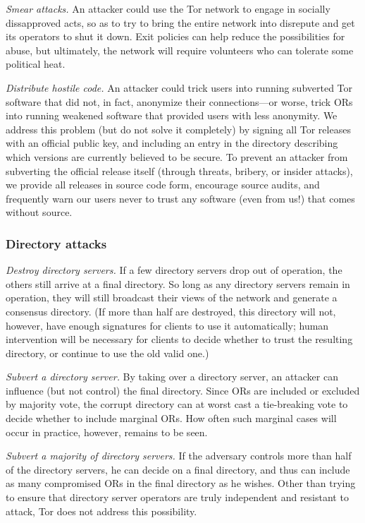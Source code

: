 \documentclass[times,10pt,twocolumn]{article}
\begin{document}
\emph{Smear attacks.} An attacker could use the Tor network to
engage in socially dissapproved acts, so as to try to bring the
entire network into disrepute and get its operators to shut it down.
Exit policies can help reduce the possibilities for abuse, but
ultimately, the network will require volunteers who can tolerate
some political heat.

\emph{Distribute hostile code.} An attacker could trick users
into running subverted Tor software that did not, in fact, anonymize
their connections---or worse, trick ORs into running weakened
software that provided users with less anonymity.  We address this
problem (but do not solve it completely) by signing all Tor releases
with an official public key, and including an entry in the directory
describing which versions are currently believed to be secure.  To
prevent an attacker from subverting the official release itself
(through threats, bribery, or insider attacks), we provide all
releases in source code form, encourage source audits, and
frequently warn our users never to trust any software (even from
us!) that comes without source.

\subsubsection*{Directory attacks}

\emph{Destroy directory servers.}  If a few directory
servers drop out of operation, the others still arrive at a final
directory.  So long as any directory servers remain in operation,
they will still broadcast their views of the network and generate a
consensus directory.  (If more than half are destroyed, this
directory will not, however, have enough signatures for clients to
use it automatically; human intervention will be necessary for
clients to decide whether to trust the resulting directory, or continue
to use the old valid one.)

\emph{Subvert a directory server.}  By taking over a directory
server, an attacker can influence (but not control) the final
directory.  Since ORs are included or excluded by majority vote,
the corrupt directory can at worst cast a tie-breaking vote to
decide whether to include marginal ORs.  How often such marginal
cases will occur in practice, however, remains to be seen.

\emph{Subvert a majority of directory servers.}  If the
adversary controls more than half of the directory servers, he can
decide on a final directory, and thus can include as many
compromised ORs in the final directory as he wishes.  Other than
trying to ensure that directory server operators are truly
independent and resistant to attack, Tor does not address this
possibility.
\end{document}
